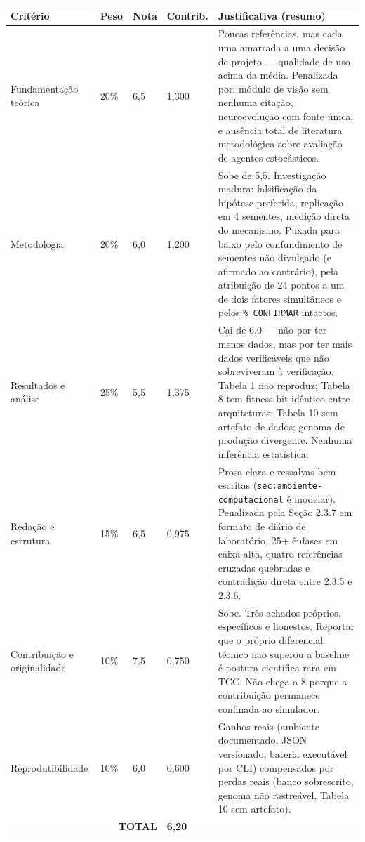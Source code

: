 \documentclass[11pt,a4paper]{article}
\begin{document}
\renewcommand{\arraystretch}{1.3}
\begin{longtable}{|p{4.1cm}|p{1.1cm}|p{1.1cm}|p{1.4cm}|p{6.6cm}|}
\hline
\textbf{Critério} & \textbf{Peso} & \textbf{Nota} & \textbf{Contrib.} & \textbf{Justificativa (resumo)} \\
\hline
\endhead
Fundamentação teórica & 20\% & 6,5 & 1,300 &
Poucas referências, mas cada uma amarrada a uma decisão de projeto --- qualidade de uso acima da
média. Penalizada por: módulo de visão sem nenhuma citação, neuroevolução com fonte única, e
ausência total de literatura metodológica sobre avaliação de agentes estocásticos. \\
\hline
Metodologia & 20\% & 6,0 & 1,200 &
Sobe de 5,5. Investigação madura: falsificação da hipótese preferida, replicação em 4 sementes,
medição direta do mecanismo. Puxada para baixo pelo confundimento de sementes não divulgado (e
afirmado ao contrário), pela atribuição de 24 pontos a um de dois fatores simultâneos e pelos
\texttt{\% CONFIRMAR} intactos. \\
\hline
Resultados e análise & 25\% & 5,5 & 1,375 &
Cai de 6,0 --- não por ter menos dados, mas por ter mais dados verificáveis que não sobreviveram à
verificação. Tabela 1 não reproduz; Tabela 8 tem fitness bit-idêntico entre arquiteturas; Tabela 10
sem artefato de dados; genoma de produção divergente. Nenhuma inferência estatística. \\
\hline
Redação e estrutura & 15\% & 6,5 & 0,975 &
Prosa clara e ressalvas bem escritas (\texttt{sec:ambiente-computacional} é modelar). Penalizada
pela Seção 2.3.7 em formato de diário de laboratório, 25+ ênfases em caixa-alta, quatro referências
cruzadas quebradas e contradição direta entre 2.3.5 e 2.3.6. \\
\hline
Contribuição e originalidade & 10\% & 7,5 & 0,750 &
Sobe. Três achados próprios, específicos e honestos. Reportar que o próprio diferencial técnico não
superou a baseline é postura científica rara em TCC. Não chega a 8 porque a contribuição permanece
confinada ao simulador. \\
\hline
Reprodutibilidade & 10\% & 6,0 & 0,600 &
Ganhos reais (ambiente documentado, JSON versionado, bateria executável por CLI) compensados por
perdas reais (banco sobrescrito, genoma não rastreável, Tabela 10 sem artefato). \\
\hline
\multicolumn{3}{|r|}{\textbf{TOTAL}} & \textbf{6,20} & \\
\hline
\end{longtable}
\end{document}
